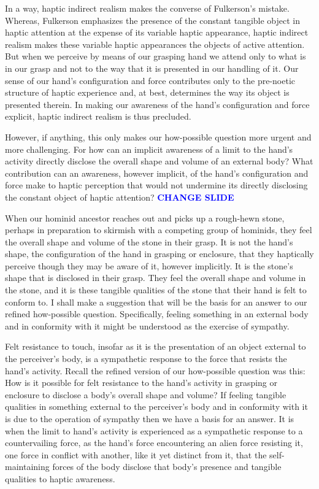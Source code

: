 \documentclass[12pt]{article}
\newcommand{\change}{\textcolor{blue}{\textbf{CHANGE SLIDE}}}
\begin{document}
In a way, haptic indirect realism makes the converse of Fulkerson's mistake. Whereas, Fulkerson emphasizes the presence of the constant tangible object in haptic attention at the expense of its variable haptic appearance, haptic indirect realism makes these variable haptic appearances the objects of active attention. But when we perceive by means of our grasping hand we attend only to what is in our grasp and not to the way that it is presented in our handling of it. Our sense of our hand's configuration and force contributes only to the pre-noetic structure of haptic experience and, at best, determines the way its object is presented therein. In making our awareness of the hand's configuration and force explicit, haptic indirect realism is thus precluded. 

However, if anything, this only makes our how-possible question more urgent and more challenging. For how can an implicit awareness of a limit to the hand's activity directly disclose the overall shape and volume of an external body? What contribution can an awareness, however implicit, of the hand's configuration and force make to haptic perception that would not undermine its directly disclosing the constant object of haptic attention? \change

When our hominid ancestor reaches out and picks up a rough-hewn stone, perhaps in preparation to skirmish with a competing group of hominids, they feel the overall shape and volume of the stone in their grasp. It is not the hand's shape, the configuration of the hand in grasping or enclosure, that they haptically perceive though they may be aware of it, however implicitly. It is the stone's shape that is disclosed in their grasp. They feel the overall shape and volume in the stone, and it is these tangible qualities of the stone that their hand is felt to conform to. I shall make a suggestion that will be the basis for an answer to our refined how-possible question. Specifically, feeling something in an external body and in conformity with it might be understood as the exercise of sympathy.

Felt resistance to touch, insofar as it is the presentation of an object external to the perceiver's body, is a sympathetic response to the force that resists the hand's activity. Recall the refined version of our how-possible question was this: How is it possible for felt resistance to the hand's activity in grasping or enclosure to disclose a body's overall shape and volume? If feeling tangible qualities in something external to the perceiver's body and in conformity with it is due to the operation of sympathy then we have a basis for an answer. It is when the limit to hand's activity is experienced as a sympathetic response to a countervailing force, as the hand's force encountering an alien force resisting it, one force in conflict with another, like it yet distinct from it, that the self-maintaining forces of the body disclose that body's presence and tangible qualities to haptic awareness.
\end{document}
